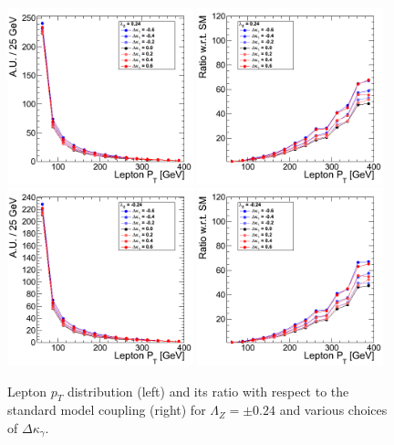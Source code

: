 \begin{figure}[h!t]
  {\centering
    \includegraphics[width=0.48\textwidth]{figs/LeptonpT_024.png}
    \includegraphics[width=0.48\textwidth]{figs/LeptonpT_024_ratio.png}
    \includegraphics[width=0.48\textwidth]{figs/LeptonpT_m024.png}
    \includegraphics[width=0.48\textwidth]{figs/LeptonpT_m024_ratio.png}
    \caption{Lepton $p_T$ distribution (left) and its ratio with respect to 
    the standard model coupling (right) for $\Lambda_Z = \pm 0.24$ and various choices of $\Delta{\kappa_\gamma}$.}
    \label{fig:ww_LeptonpT_atgcRatio024}}
\end{figure}

